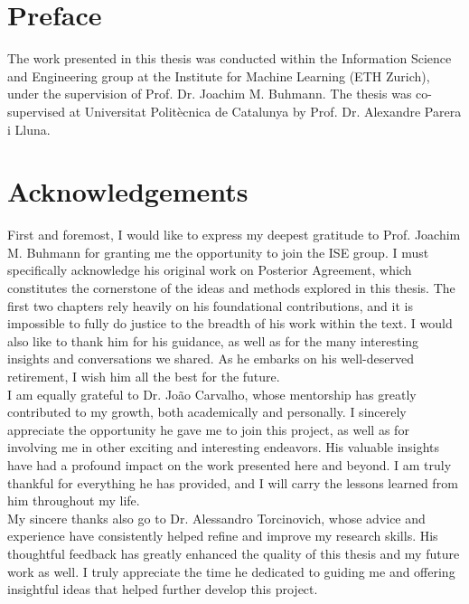 
\chapter*{Preface}

The work presented in this thesis was conducted within the Information Science and Engineering 
group at the Institute for Machine Learning (ETH Zurich), under the supervision of 
Prof. Dr. Joachim M. Buhmann. The thesis was co-supervised at Universitat Polit\`ecnica 
de Catalunya by Prof. Dr. Alexandre Parera i Lluna.

\chapter*{Acknowledgements}

First and foremost, I would like to express my deepest gratitude to Prof. Joachim M. 
Buhmann for granting me the opportunity to join the ISE group. I must specifically 
acknowledge his original work on Posterior Agreement, which constitutes the cornerstone 
of the ideas and methods explored in this thesis. The first two chapters rely heavily 
on his foundational contributions, and it is impossible to fully do justice to the 
breadth of his work within the text. I would also like to thank him for his guidance, 
as well as for the many interesting insights and conversations we shared. As he embarks on his 
well-deserved retirement, I wish him all the best for the future. \\

I am equally grateful to Dr. Jo\~ao Carvalho, whose mentorship has greatly contributed 
to my growth, both academically and personally. I sincerely appreciate the opportunity 
he gave me to join this project, as well as for involving me in other exciting and 
interesting endeavors. His valuable insights have had a profound impact on the 
work presented here and beyond. I am truly thankful for everything he has provided, 
and I will carry the lessons learned from him throughout my life. \\

My sincere thanks also go to Dr. Alessandro Torcinovich, whose advice and experience have consistently 
helped refine and improve my research skills. His thoughtful feedback has greatly enhanced 
the quality of this thesis and my future work as well. I truly appreciate the time he 
dedicated to guiding me and offering insightful ideas that helped further 
develop this project. \\

